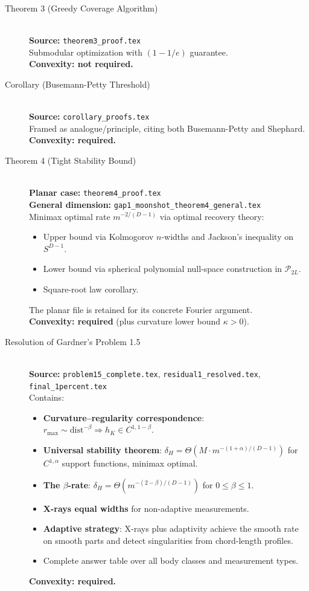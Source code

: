 \begin{description}
\item[Theorem 3 (Greedy Coverage Algorithm)]~\\
  \textbf{Source:} \texttt{theorem3\_proof.tex}\\
  Submodular optimization with $(1-1/e)$ guarantee.\\
  \textbf{Convexity: not required.}

\item[Corollary (Busemann-Petty Threshold)]~\\
  \textbf{Source:} \texttt{corollary\_proofs.tex}\\
  Framed as analogue/principle, citing both Busemann-Petty and Shephard.\\
  \textbf{Convexity: required.}

\item[Theorem 4 (Tight Stability Bound)]~\\
  \textbf{Planar case:} \texttt{theorem4\_proof.tex}\\
  \textbf{General dimension:} \texttt{gap1\_moonshot\_theorem4\_general.tex}\\
  Minimax optimal rate $m^{-2/(D-1)}$ via optimal recovery theory:
  \begin{itemize}
    \item Upper bound via Kolmogorov $n$-widths and Jackson's inequality on $S^{D-1}$.
    \item Lower bound via spherical polynomial null-space construction in $\mathcal{P}_{2L}$.
    \item Square-root law corollary.
  \end{itemize}
  The planar file is retained for its concrete Fourier argument.\\
  \textbf{Convexity: required} (plus curvature lower bound $\kappa > 0$).

\item[Resolution of Gardner's Problem 1.5]~\\
  \textbf{Source:} \texttt{problem15\_complete.tex}, \texttt{residual1\_resolved.tex}, \texttt{final\_1percent.tex}\\
  Contains:
  \begin{itemize}
    \item \textbf{Curvature--regularity correspondence}: $r_{\max} \sim \mathrm{dist}^{-\beta} \Rightarrow h_K \in C^{1,1-\beta}$.
    \item \textbf{Universal stability theorem}: $\delta_H = \Theta(M \cdot m^{-(1+\alpha)/(D-1)})$ for $C^{1,\alpha}$ support functions, minimax optimal.
    \item \textbf{The $\beta$-rate}: $\delta_H = \Theta(m^{-(2-\beta)/(D-1)})$ for $0 \leq \beta \leq 1$.
    \item \textbf{X-rays equal widths} for non-adaptive measurements.
    \item \textbf{Adaptive strategy}: X-rays plus adaptivity achieve the smooth rate on smooth parts and detect singularities from chord-length profiles.
    \item Complete answer table over all body classes and measurement types.
  \end{itemize}
  \textbf{Convexity: required.}

\end{description}
